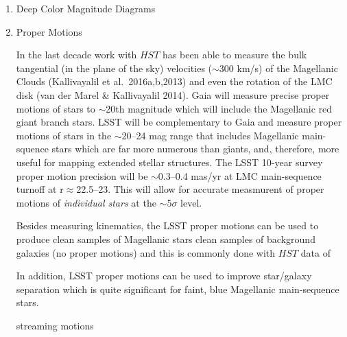 \begin{enumerate}

\item Deep Color Magnitude Diagrams


\item Proper Motions

In the last decade work with $HST$ has been able to measure the bulk tangential (in the plane of the sky) velocities ($\sim$300 km/s) of the
Magellanic Clouds (Kallivayalil et al.\ 2016a,b,2013) and even the rotation of the LMC disk (van der Marel \& Kallivayalil 2014).
Gaia will measure precise proper motions of stars to $\sim$20th magnitude which will include the Magellanic red giant branch stars.
LSST will be complementary to Gaia and measure proper motions of stars in the $\sim$20--24 mag range that includes Magellanic main-squence stars
which are far more numerous than giants, and, therefore, more useful for mapping extended stellar structures.
The LSST 10-year survey proper motion precision will be $\sim$0.3--0.4 mas/yr at LMC main-sequence turnoff at r$\approx$22.5--23.  This
will allow for accurate measmurent of proper motions of {\em individual stars} at the $\sim$5$\sigma$ level.

Besides measuring kinematics, the LSST proper motions can be used to produce clean samples of Magellanic stars 
clean samples of background galaxies (no proper motions) and 
this is commonly done with $HST$ data of 

In addition, LSST proper motions can be used to improve star/galaxy separation which is quite significant for faint, blue Magellanic
main-sequence stars.

streaming motions

%
%




\end{enumerate}
